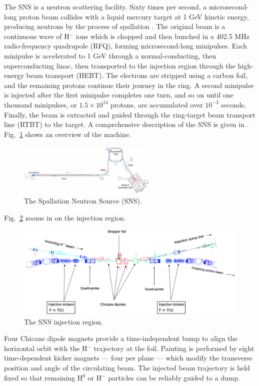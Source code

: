 The SNS is a neutron scattering facility. Sixty times per second, a microsecond-long proton beam collides with a liquid mercury target at 1 GeV kinetic energy, producing neutrons by the process of spallation \cite{Russell1990}. The original beam is a continuous wave of H$^-$ ions which is chopped and then bunched in a 402.5 MHz radio-frequency quadrupole (RFQ), forming microsecond-long minipulses. Each minipulse is accelerated to 1 GeV through a normal-conducting, then superconducting linac, then transported to the injection region through the high-energy beam transport (HEBT). The electrons are stripped using a carbon foil, and the remaining protons continue their journey in the ring. A second minipulse is injected after the first minipulse completes one turn, and so on until one thousand minipulses, or $1.5 \times 10^{14}$ protons, are accumulated over $10^{-3}$ seconds. Finally, the beam is extracted and guided through the ring-target beam transport line (RTBT) to the target. A comprehensive description of the SNS is given in \cite{Henderson2014}. Fig.~\ref{fig:SNS} shows an overview of the machine.
%
\begin{figure}[!p]
    \centering
    \includegraphics[angle=-90, width=0.6\textwidth]{Images/chapter1/SNS.png}
    \caption{The Spallation Neutron Source (SNS).}
    \label{fig:SNS}
\end{figure}
%

Fig.~\ref{fig:SNS_injection_region} zooms in on the injection region.
%
\begin{figure}[!p]
    \centering
    \vspace*{5cm}
    \includegraphics[width=\textwidth]{Images/chapter1/SNS_injection_region1.png}
    \caption{The SNS injection region.}
    \label{fig:SNS_injection_region}
    \vspace*{5cm}
\end{figure}
%
Four Chicane dipole magnets provide a time-independent bump to align the horizontal orbit with the H$^-$ trajectory at the foil. Painting is performed by eight time-dependent kicker magnets — four per plane — which modify the transverse position and angle of the circulating beam. The injected beam trajectory is held fixed so that remaining H$^0$ or H$^-$ particles can be reliably guided to a dump.


